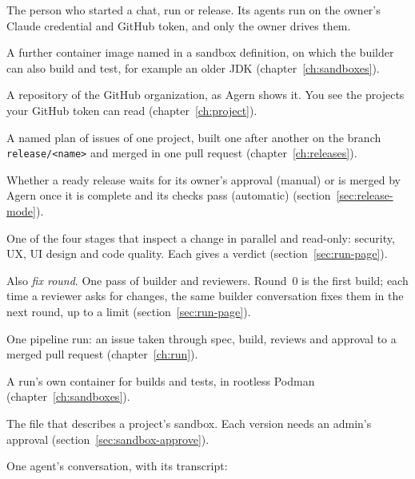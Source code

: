 \begin{description}[style=nextline,leftmargin=1.5em,font=\normalfont\bfseries]
  \item[owner]\label{gl:owner} The person who started a chat, run or release. Its
    agents run on the owner's Claude credential and GitHub token, and only the owner drives them.
  \item[platform]\label{gl:platform} A further container image named in a sandbox
    definition, on which the builder can also build and test, for example an older JDK
    (chapter~\ref{ch:sandboxes}).
  \item[project]\label{gl:project} A repository of the GitHub organization, as Agern
    shows it. You see the projects your GitHub token can read (chapter~\ref{ch:project}).
  \item[release]\label{gl:release} A named plan of issues of one project, built one
    after another on the branch \texttt{release/<name>} and merged in one pull request
    (chapter~\ref{ch:releases}).
  \item[release mode]\label{gl:release-mode} Whether a ready release waits for
    its owner's approval (manual) or is merged by Agern once it is complete and its checks pass
    (automatic) (section~\ref{sec:release-mode}).
  \item[reviewer]\label{gl:reviewer} One of the four stages that inspect a change in
    parallel and read-only: security, UX, UI design and code quality. Each gives a verdict
    (section~\ref{sec:run-page}).
  \item[round]\label{gl:round-term} Also \emph{fix round}. One pass of builder and reviewers. Round~0
    is the first build; each time a reviewer asks for changes, the same builder conversation fixes
    them in the next round, up to a limit (section~\ref{sec:run-page}).
  \item[run]\label{gl:run} One pipeline run: an issue taken through spec, build, reviews
    and approval to a merged pull request (chapter~\ref{ch:run}).
  \item[sandbox]\label{gl:sandbox} A run's own container for builds and tests, in
    rootless Podman (chapter~\ref{ch:sandboxes}).
  \item[sandbox definition]\label{gl:sandbox-definition} The file
     that describes a project's sandbox. Each version needs an admin's
    approval (section~\ref{sec:sandbox-approve}).
  \item[session]\label{gl:session} One agent's conversation, with its transcript:

\end{description}
